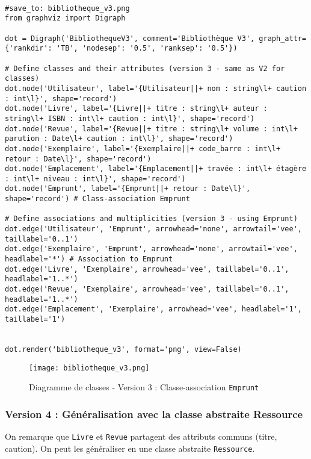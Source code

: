 \documentclass{article}
\begin{document}
\begin{verbatim}

#save_to: bibliotheque_v3.png
from graphviz import Digraph

dot = Digraph('BibliothequeV3', comment='Bibliothèque V3', graph_attr={'rankdir': 'TB', 'nodesep': '0.5', 'ranksep': '0.5'})

# Define classes and their attributes (version 3 - same as V2 for classes)
dot.node('Utilisateur', label='{Utilisateur||+ nom : string\l+ caution : int\l}', shape='record')
dot.node('Livre', label='{Livre||+ titre : string\l+ auteur : string\l+ ISBN : int\l+ caution : int\l}', shape='record')
dot.node('Revue', label='{Revue||+ titre : string\l+ volume : int\l+ parution : Date\l+ caution : int\l}', shape='record')
dot.node('Exemplaire', label='{Exemplaire||+ code_barre : int\l+ retour : Date\l}', shape='record')
dot.node('Emplacement', label='{Emplacement||+ travée : int\l+ étagère : int\l+ niveau : int\l}', shape='record')
dot.node('Emprunt', label='{Emprunt||+ retour : Date\l}', shape='record') # Class-association Emprunt

# Define associations and multiplicities (version 3 - using Emprunt)
dot.edge('Utilisateur', 'Emprunt', arrowhead='none', arrowtail='vee', taillabel='0..1')
dot.edge('Exemplaire', 'Emprunt', arrowhead='none', arrowtail='vee', headlabel='*') # Association to Emprunt
dot.edge('Livre', 'Exemplaire', arrowhead='vee', taillabel='0..1', headlabel='1..*')
dot.edge('Revue', 'Exemplaire', arrowhead='vee', taillabel='0..1', headlabel='1..*')
dot.edge('Emplacement', 'Exemplaire', arrowhead='vee', headlabel='1', taillabel='1')


dot.render('bibliotheque_v3', format='png', view=False)
\end{verbatim}

\begin{figure}[H]
    \centering
    \texttt{[image: bibliotheque\_v3.png]}
    \caption{Diagramme de classes - Version 3 : Classe-association \texttt{Emprunt}}
    \label{fig:bibliotheque_v3}
\end{figure}


\subsubsection{Version 4 : Généralisation avec la classe abstraite Ressource}

On remarque que \texttt{Livre} et \texttt{Revue} partagent des attributs communs (titre, caution). On peut les généraliser en une classe abstraite \texttt{Ressource}.
\end{document}
